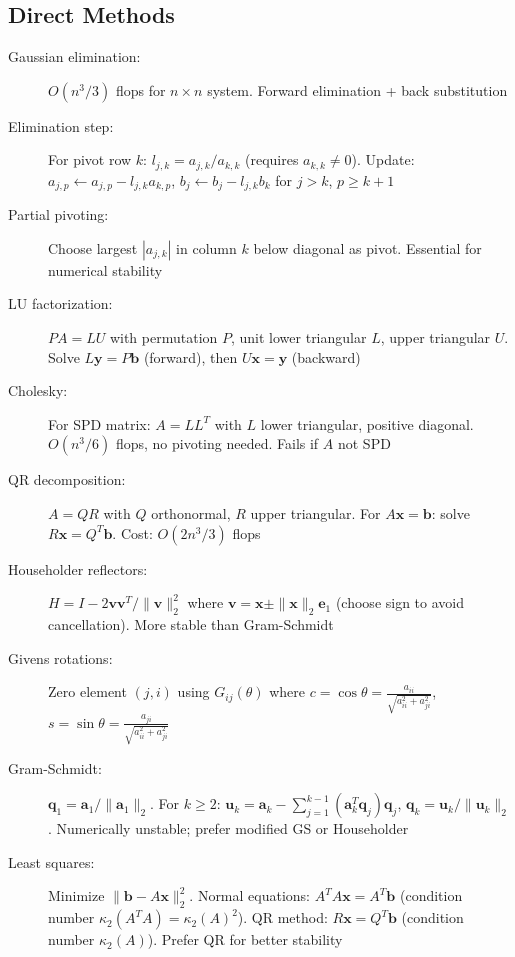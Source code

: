 \documentclass[a4paper,10pt,landscape]{article}
\begin{document}
\begin{multicols*}{3}
    \subsection*{Direct Methods}
    \begin{description}
        \item[Gaussian elimination:] $O(n^3/3)$ flops for $n \times n$ system. Forward elimination + back substitution
        \item[Elimination step:] For pivot row $k$: $l_{j,k} = a_{j,k}/a_{k,k}$ (requires $a_{k,k} \neq 0$). Update: $a_{j,p} \leftarrow a_{j,p} - l_{j,k}a_{k,p}$, $b_j \leftarrow b_j - l_{j,k}b_k$ for $j>k$, $p \geq k+1$
        \item[Partial pivoting:] Choose largest $|a_{j,k}|$ in column $k$ below diagonal as pivot. Essential for numerical stability
        \item[LU factorization:] $PA = LU$ with permutation $P$, unit lower triangular $L$, upper triangular $U$. Solve $L\mathbf{y} = P\mathbf{b}$ (forward), then $U\mathbf{x} = \mathbf{y}$ (backward)
        \item[Cholesky:] For SPD matrix: $A = LL^T$ with $L$ lower triangular, positive diagonal. $O(n^3/6)$ flops, no pivoting needed. Fails if $A$ not SPD
        \item[QR decomposition:] $A = QR$ with $Q$ orthonormal, $R$ upper triangular. For $A\mathbf{x} = \mathbf{b}$: solve $R\mathbf{x} = Q^T\mathbf{b}$. Cost: $O(2n^3/3)$ flops
        \item[Householder reflectors:] $H = I - 2\mathbf{v}\mathbf{v}^T/\|\mathbf{v}\|_2^2$ where $\mathbf{v} = \mathbf{x} \pm \|\mathbf{x}\|_2\mathbf{e}_1$ (choose sign to avoid cancellation). More stable than Gram-Schmidt
        \item[Givens rotations:] Zero element $(j,i)$ using $G_{ij}(\theta)$ where $c = \cos\theta = \frac{a_{ii}}{\sqrt{a_{ii}^2+a_{ji}^2}}$, $s = \sin\theta = \frac{a_{ji}}{\sqrt{a_{ii}^2+a_{ji}^2}}$
        \item[Gram-Schmidt:] $\mathbf{q}_1 = \mathbf{a}_1/\|\mathbf{a}_1\|_2$. For $k \geq 2$: $\mathbf{u}_k = \mathbf{a}_k - \sum_{j=1}^{k-1}(\mathbf{a}_k^T\mathbf{q}_j)\mathbf{q}_j$, $\mathbf{q}_k = \mathbf{u}_k/\|\mathbf{u}_k\|_2$. Numerically unstable; prefer modified GS or Householder
        \item[Least squares:] Minimize $\|\mathbf{b} - A\mathbf{x}\|_2^2$. Normal equations: $A^TA\mathbf{x} = A^T\mathbf{b}$ (condition number $\kappa_2(A^TA) = \kappa_2(A)^2$). QR method: $R\mathbf{x} = Q^T\mathbf{b}$ (condition number $\kappa_2(A)$). Prefer QR for better stability
    \end{description}


\end{multicols*}
\end{document}
